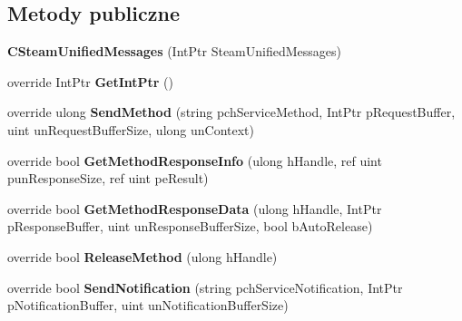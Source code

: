 \subsection*{Metody publiczne}
\begin{DoxyCompactItemize}
\item 
\mbox{\label{class_valve_1_1_steamworks_1_1_c_steam_unified_messages_a29b68c12516e1554d0681cec27cb566b}} 
{\bfseries C\+Steam\+Unified\+Messages} (Int\+Ptr Steam\+Unified\+Messages)
\item 
\mbox{\label{class_valve_1_1_steamworks_1_1_c_steam_unified_messages_a173c8fc90b26baddfcbad982c1b1fbe7}} 
override Int\+Ptr {\bfseries Get\+Int\+Ptr} ()
\item 
\mbox{\label{class_valve_1_1_steamworks_1_1_c_steam_unified_messages_aab9114879c35a4528a28f9c3546c116d}} 
override ulong {\bfseries Send\+Method} (string pch\+Service\+Method, Int\+Ptr p\+Request\+Buffer, uint un\+Request\+Buffer\+Size, ulong un\+Context)
\item 
\mbox{\label{class_valve_1_1_steamworks_1_1_c_steam_unified_messages_a14b06e917ddfa7ee368c1175e76ca6a9}} 
override bool {\bfseries Get\+Method\+Response\+Info} (ulong h\+Handle, ref uint pun\+Response\+Size, ref uint pe\+Result)
\item 
\mbox{\label{class_valve_1_1_steamworks_1_1_c_steam_unified_messages_a0587e2bdc8bc40269c528b7859247b2a}} 
override bool {\bfseries Get\+Method\+Response\+Data} (ulong h\+Handle, Int\+Ptr p\+Response\+Buffer, uint un\+Response\+Buffer\+Size, bool b\+Auto\+Release)
\item 
\mbox{\label{class_valve_1_1_steamworks_1_1_c_steam_unified_messages_ade720abf328f9dea030ad052a1776f1d}} 
override bool {\bfseries Release\+Method} (ulong h\+Handle)
\item 
\mbox{\label{class_valve_1_1_steamworks_1_1_c_steam_unified_messages_a8f02ffe148d064f85fd1f8e8de4ab2fc}} 
override bool {\bfseries Send\+Notification} (string pch\+Service\+Notification, Int\+Ptr p\+Notification\+Buffer, uint un\+Notification\+Buffer\+Size)
\end{DoxyCompactItemize}


